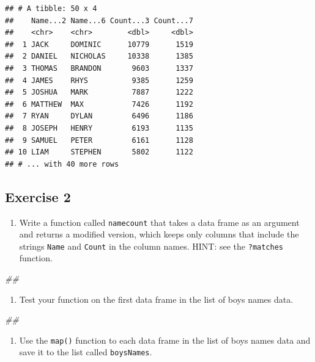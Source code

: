 \documentclass[
]{book}
\newenvironment{Shaded}{\begin{snugshade}}{\end{snugshade}}
\newcommand{\CommentTok}[1]{\textcolor[rgb]{0.56,0.35,0.01}{\textit{#1}}}
\providecommand{\tightlist}{%
  \setlength{\itemsep}{0pt}\setlength{\parskip}{0pt}}
\begin{document}
\begin{verbatim}
## # A tibble: 50 x 4
##    Name...2 Name...6 Count...3 Count...7
##    <chr>    <chr>        <dbl>     <dbl>
##  1 JACK     DOMINIC      10779      1519
##  2 DANIEL   NICHOLAS     10338      1385
##  3 THOMAS   BRANDON       9603      1337
##  4 JAMES    RHYS          9385      1259
##  5 JOSHUA   MARK          7887      1222
##  6 MATTHEW  MAX           7426      1192
##  7 RYAN     DYLAN         6496      1186
##  8 JOSEPH   HENRY         6193      1135
##  9 SAMUEL   PETER         6161      1128
## 10 LIAM     STEPHEN       5802      1122
## # ... with 40 more rows
\end{verbatim}

\hypertarget{exercise-2-2}{%
\subsection{Exercise 2}\label{exercise-2-2}}

\begin{enumerate}
\def\labelenumi{\arabic{enumi}.}
\tightlist
\item
  Write a function called \texttt{namecount} that takes a data frame as an
  argument and returns a modified version, which keeps only columns that
  include the strings \texttt{Name} and \texttt{Count} in the column names.
  HINT: see the \texttt{?matches} function.
\end{enumerate}

\begin{Shaded}
\begin{Highlighting}[]
\CommentTok{\#\# }
\end{Highlighting}
\end{Shaded}

\begin{enumerate}
\def\labelenumi{\arabic{enumi}.}
\setcounter{enumi}{1}
\tightlist
\item
  Test your function on the first data frame in the list of boys
  names data.
\end{enumerate}

\begin{Shaded}
\begin{Highlighting}[]
\CommentTok{\#\# }
\end{Highlighting}
\end{Shaded}

\begin{enumerate}
\def\labelenumi{\arabic{enumi}.}
\setcounter{enumi}{2}
\tightlist
\item
  Use the \texttt{map()} function to each data frame in the list of boys
  names data and save it to the list called \texttt{boysNames}.
\end{enumerate}
\end{document}
